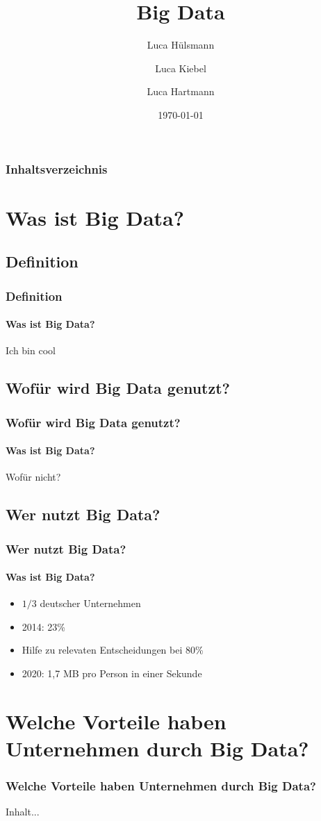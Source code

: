\documentclass[10pt,a4paper]{beamer}
\author{Luca Hülsmann \and Luca Kiebel \and Luca Hartmann}
\title{Big Data}
\date{\today}
\begin{document}
\begin{frame}
\titlepage
\end{frame}

\begin{frame}
\frametitle{Inhaltsverzeichnis}\tableofcontents
\end{frame}

\section{Was ist Big Data?}

\subsection{Definition}
\begin{frame}
\frametitle{Definition}
\framesubtitle{Was ist Big Data?}
Ich bin cool
\end{frame}

\subsection{Wofür wird Big Data genutzt?}
\begin{frame}
\frametitle{Wofür wird Big Data genutzt?}
\framesubtitle{Was ist Big Data?}
Wofür nicht?
\end{frame}

\subsection{Wer nutzt Big Data?}
\begin{frame}
\frametitle{Wer nutzt Big Data?}
\framesubtitle{Was ist Big Data?}
\begin{itemize}
\item \( 1/3\) deutscher Unternehmen
\pause
\item 2014: 23\%
\pause
\item Hilfe zu relevaten Entscheidungen bei 80\%
\pause
\item 2020: 1,7 MB pro Person in einer Sekunde 
\end{itemize}
\end{frame}

\section{Welche Vorteile haben Unternehmen durch Big Data?}
\begin{frame}
\frametitle{Welche Vorteile haben Unternehmen durch Big Data?}
Inhalt...
\end{frame}
\end{document}
